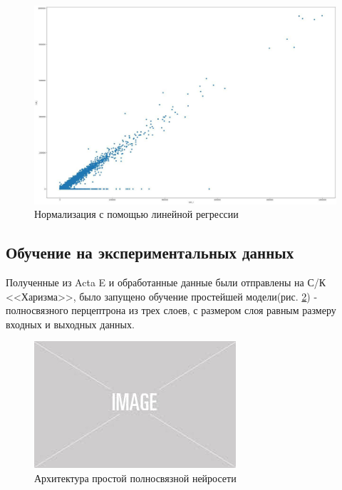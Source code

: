 \documentclass{article}
\begin{document}
\begin{figure}[!htp]
\includegraphics[width=\linewidth]{imgs/dist_lr.jpg}
  \caption{Нормализация с помощью линейной регрессии}\label{img:dist_lr}
\end{figure}

\subsection{Обучение на экспериментальных данных}
Полученные из Acta E и обработанные данные были отправлены на С/К <<Харизма>>, было запущено обучение простейшей модели(рис. \ref{img:model1}) - полносвязного перцептрона из трех слоев, с размером слоя равным размеру входных и выходных данных.  

\begin{figure}[!htp]
\includegraphics[width=\linewidth]{imgs/placeholder.jpeg}
\caption{Архитектура простой полносвязной нейросети}
\label{img:model1}
\end{figure}
\end{document}
